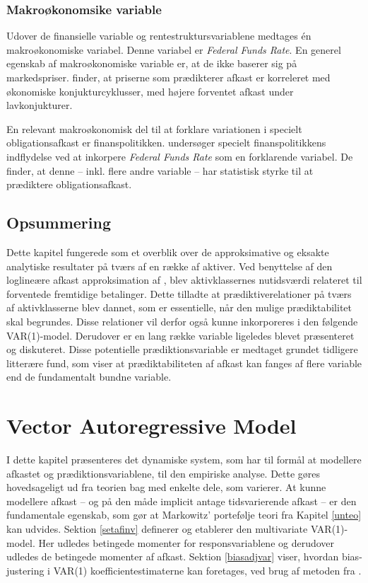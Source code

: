 \documentclass[
  a4paper,
  oneside]{memoir}
\begin{document}
\hypertarget{makrouxf8konomsike-variable}{%
\subsection{Makroøkonomsike variable}\label{makrouxf8konomsike-variable}}

Udover de finansielle variable og rentestruktursvariablene medtages én makroøkonomiske variabel. Denne variabel er \emph{Federal Funds Rate}. En generel egenskab af makroøkonomiske variable er, at de ikke baserer sig på markedspriser. \citep{Cochrane2008} finder, at priserne som prædikterer afkast er korreleret med økonomiske konjukturcyklusser, med højere forventet afkast under lavkonjukturer.

En relevant makroøkonomisk del til at forklare variationen i specielt obligationsafkast er finanspolitikken. \citep{Dai2005} undersøger specielt finanspolitikkens indflydelse ved at inkorpere \emph{Federal Funds Rate} som en forklarende variabel. De finder, at denne -- inkl. flere andre variable -- har statistisk styrke til at prædiktere obligationsafkast.

\hypertarget{opsafkrel}{%
\section{Opsummering}\label{opsafkrel}}

Dette kapitel fungerede som et overblik over de approksimative og eksakte analytiske resultater på tværs af en række af aktiver. Ved benyttelse af den loglineære afkast approksimation af \citep{Campbell1988}, blev aktivklassernes nutidsværdi relateret til forventede fremtidige betalinger. Dette tilladte at prædiktiverelationer på tværs af aktivklasserne blev dannet, som er essentielle, når den mulige prædiktabilitet skal begrundes. Disse relationer vil derfor også kunne inkorporeres i den følgende VAR(1)-model. Derudover er en lang række variable ligeledes blevet præsenteret og diskuteret. Disse potentielle prædiktionsvariable er medtaget grundet tidligere litterære fund, som viser at prædiktabiliteten af afkast kan fanges af flere variable end de fundamentalt bundne variable.

\hypertarget{varkapitel}{%
\chapter{Vector Autoregressive Model}\label{varkapitel}}

I dette kapitel præsenteres det dynamiske system, som har til formål at modellere afkastet og prædiktionsvariablene, til den empiriske analyse. Dette gøres hovedsageligt ud fra teorien bag \citep{Userguide2004} med enkelte dele, som varierer. At kunne modellere afkast -- og på den måde implicit antage tidsvarierende afkast -- er den fundamentale egenskab, som gør at Markowitz' portefølje teori fra Kapitel \ref{unteo} kan udvides. Sektion \ref{setafinv} definerer og etablerer den multivariate VAR(1)-model. Her udledes betingede momenter for responsvariablene og derudover udledes de betingede momenter af afkast. Sektion \ref{biasadjvar} viser, hvordan bias-justering i VAR(1) koefficientestimaterne kan foretages, ved brug af metoden fra \citep{Engsted2012, Pope1990}.
\end{document}
